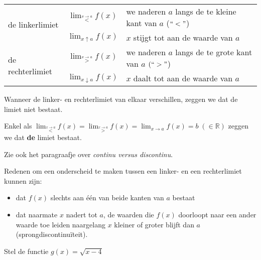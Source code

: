 \begin{table}[h]
\centering
\begin{tabular}{|l|c|l|}
	\hline 
	\multirow{2}{*}{de linkerlimiet} & ${\displaystyle \lim_{\overset{x\rightarrow a}{<}}}f(x)$ & we naderen $a$ langs de te kleine kant van $a$ ($\lyxmathsym{\textquotedblleft}<\lyxmathsym{\textquotedblright}$)\\
	\cline{2-3} 
	& ${\displaystyle \lim_{x\uparrow a}}f(x)$ & $x$ stijgt tot aan de waarde van $a$\\
	\hline 
	\multirow{2}{*}{de rechterlimiet} & ${\displaystyle \lim_{\overset{x\rightarrow a}{>}}}f(x)$ & we naderen $a$ langs de te grote kant van $a$ $(\lyxmathsym{\textquotedblleft}>\lyxmathsym{\textquotedblright}$)\\
	\cline{2-3} 
	& ${\displaystyle \lim_{x\downarrow a}}f(x)$ & $x$ daalt tot aan de waarde van $a$\\
	\hline 
\end{tabular}
\end{table}

\medskip{}


\noindent Wanneer de linker- en rechterlimiet van elkaar verschillen,
zeggen we dat de limiet niet bestaat. 

\noindent Enkel als ${\displaystyle \lim_{\overset{x\rightarrow a}{<}}}f(x)={\displaystyle \lim_{\overset{x\rightarrow a}{>}}}f(x)={\displaystyle \lim_{x\to a}}f(x)=b\;(\in\mathbb{R})$
zeggen we dat \textbf{de} limiet bestaat.

\noindent Zie ook het paragraafje over \emph{continu versus discontinu}.

\noindent Redenen om een onderscheid te maken tussen een linker- en
een rechterlimiet kunnen zijn:
\begin{itemize}
\item dat $f(x)$ slechts aan \'e\'en van beide kanten van $a$ bestaat
\item dat naarmate $x$ nadert tot $a$, de waarden die $f(x)$ doorloopt
naar een ander waarde toe leiden naargelang $x$ kleiner of groter
blijft dan $a$ (sprongdiscontinu\"iteit).
\end{itemize}
\medskip{}



Stel de functie $g(x)=\sqrt{x-4}$



